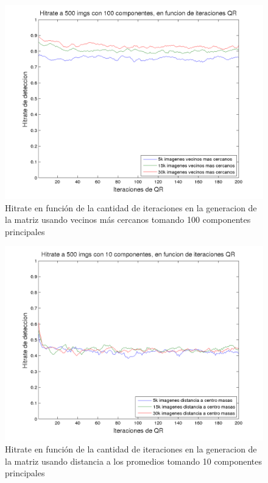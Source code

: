 \begin{figure}[H]
\begin {center}
\includegraphics[width=\hrwidth]{plots/HR_100_1.png}
\end {center}
\caption{Hitrate en funci\'on de la cantidad de iteraciones en la generacion de la matriz
usando vecinos m\'as cercanos tomando 100 componentes principales}
\label{fig:HR10Neig}
\end{figure}


\begin{figure}[H]
\begin {center}
\includegraphics[width=\hrwidth]{plots/HR_10_0.png}
\end {center}
\caption{Hitrate en funci\'on de la cantidad de iteraciones en la generacion de la matriz
usando distancia a los promedios tomando 10 componentes principales}
\label{fig:HR10Avg}
\end{figure}


